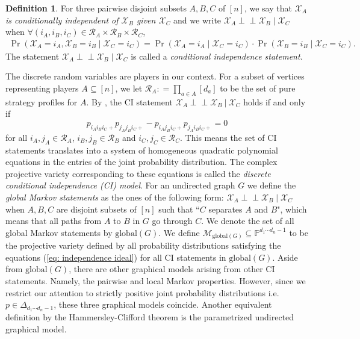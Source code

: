 \documentclass[11pt]{amsart}
\numberwithin{equation}{section}
\theoremstyle{plain}
\numberwithin{theorem}{section}
\theoremstyle{definition}
\newtheorem{definition}[theorem]{Definition}
\def\ci{\perp\!\!\!\perp}
\begin{document}
\begin{definition}\label{Definition 1.2}
 For three pairwise disjoint subsets $A,B,C$ of $[n]$, we say that \textit{$\mathcal{X}_A$ is conditionally independent of $\mathcal{X}_B$ given $\mathcal{X}_C$} and we write $\mathcal{X}_A\ci \mathcal{X}_B\mid \mathcal{X}_C$ when $\forall(i_A,i_B,i_C)\in\mathcal R_A \times\mathcal R_B\times\mathcal R_C$,
\begin{align*}
   \Pr(\mathcal{X}_A=i_A,\mathcal{X}_B=i_B\mid \mathcal{X}_C=i_C)=\Pr(\mathcal{X}_A=i_A\mid \mathcal{X}_C=i_C)\cdot \Pr(\mathcal{X}_B=i_B\mid \mathcal{X}_C=i_C).
\end{align*}
The statement $\mathcal{X}_A\ci \mathcal{X}_B\mid \mathcal{X}_C$ is called a \textit{conditional independence statement}.   
\end{definition}

The discrete random variables are players in our context. For a subset of vertices representing players $A \subseteq [n]$, we let $\mathcal{R}_A : = \prod_{a \in A} [d_a]$ to be the set of pure strategy profiles for $A$. By \cite[Proposition $4.1.6$]{sullivant2018algebraic}, the CI statement $\mathcal{X}_A \ci \mathcal{X}_{B} \ | \ \mathcal{X}_{C}$ holds if and only if  \begin{equation}\label{eq: independence ideal} p_{i_A i_B i_C +} p_{j_A j_B i_C +} - p_{i_A j_B i_C+} p_{j_A i_B i_C +} = 0 \end{equation} for all $i_A, j_A \in \mathcal{R}_A$, $i_B, j_B \in \mathcal{R}_B$ and $i_C, j_C \in \mathcal{R}_C$. This means the set of CI statements translates into a system of homogeneous quadratic polynomial equations in the entries of the joint probability distribution. The complex projective variety corresponding to these equations is called the \textit{discrete conditional independence (CI) model}. For an undirected graph $G$ we define the \textit{global Markov statements} as the ones of the following form: 
$\mathcal{X}_A \ci \mathcal{X}_B\mid \mathcal{X}_C$ when $A,B,C$ are disjoint subsets of $[n]$ such that ``$C$ separates $A$ and $B$", which means that all paths from $A$ to $B$ in $G$ go through $C$. We denote the set of all global Markov statements by $\mathrm{global}(G)$. We define $\mathcal{M}_{\mathrm{global}(G)} \subseteq \mathbb P^{d_1 \cdots d_n -1}$ to be the projective variety defined by all probability distributions satisfying the equations (\ref{eq: independence ideal}) for all CI statements in $\mathrm{global}(G)$.
Aside from $\mathrm{global}(G)$, there are other graphical models arising from other CI statements. Namely, the pairwise and local Markov properties. However, since we restrict our attention to strictly positive joint probability distributions i.e.\ $p \in \Delta_{d_1 \cdots d_n -1}$, these three graphical models coincide.
Another equivalent definition by the Hammersley-Clifford theorem is the parametrized undirected graphical model. 
\end{document}
